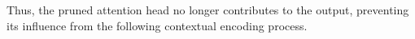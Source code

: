 Thus, the pruned attention head no longer contributes to the output, preventing its influence from the following contextual encoding process.








